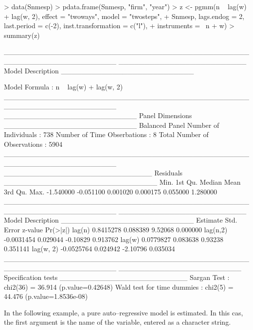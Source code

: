 \documentclass{article}
\begin{document}
\begin{Schunk}
\begin{Sinput}
> data(Snmesp)
> pdata.frame(Snmesp, "firm", "year")
> z <- pgmm(n ~ lag(w) + lag(w, 2), effect = "twoways", model = "twosteps", 
+     Snmesp, lags.endog = 2, last.period = c(-2), inst.transformation = c("l"), 
+     instruments = ~n + w)
> summary(z)
\end{Sinput}
\begin{Soutput}
______________________________________________________________________ 
_________________________ Model Description __________________________


Model Formula             : n ~ lag(w) + lag(w, 2)
______________________________________________________________________ 
__________________________ Panel Dimensions __________________________
Balanced Panel
Number of Individuals        :  738
Number of Time Obserbations  :  8
Total Number of Observations :  5904
______________________________________________________________________ 
_____________________________ Residuals ______________________________
     Min.   1st Qu.    Median      Mean   3rd Qu.      Max. 
-1.540000 -0.051100  0.001020  0.000175  0.055000  1.280000 
______________________________________________________________________ 
_________________________ Model Description __________________________
            Estimate Std. Error  z-value Pr(>|z|)
lag(n)     0.8415278   0.088389  9.52068 0.000000
lag(n,2)  -0.0031454   0.029044 -0.10829 0.913762
lag(w)     0.0779827   0.083638  0.93238 0.351141
lag(w, 2) -0.0525764   0.024942 -2.10796 0.035034
______________________________________________________________________ 
________________________ Specification tests _________________________
Sargan Test                   : chi2(36) = 36.914 (p.value=0.42648)
Wald test for time dummies    : chi2(5) = 44.476 (p.value=1.8536e-08)
\end{Soutput}
\end{Schunk}

In the following example, a pure auto--regressive model is
estimated. In this cas, the first argument is the name of the
variable, entered as a character string.
\end{document}
